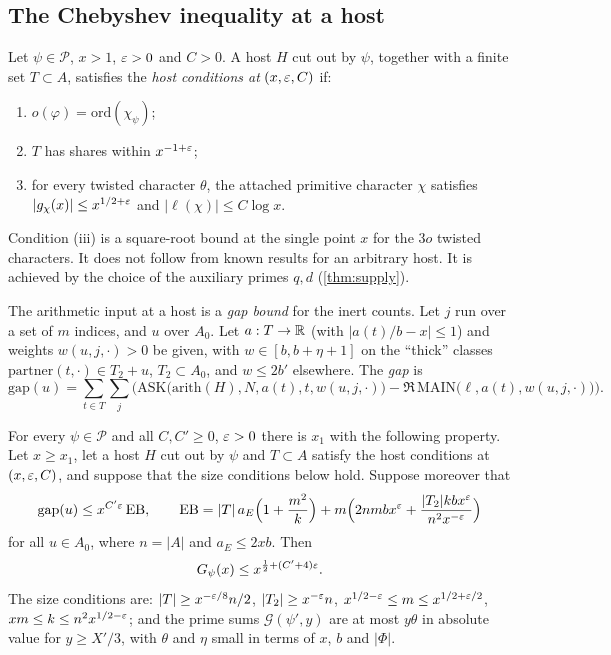 \subsection{The Chebyshev inequality at a host}

\begin{definition}\label{def:hosts:EAtH}
Let $\psi\in\mathcal P$, $x>1$, $\varepsilon>0$ and $C>0$. A host $H$ cut out by $\psi$, together with a finite
set $T\subset A$, satisfies the \emph{host conditions at} $(x,\varepsilon,C)$ if:
\begin{enumerate}[label=(\roman*)]
\item $o(\varphi)=\mathrm{ord}(\chi_\psi)$;
\item $T$ has shares within $x^{-1+\varepsilon}$;
\item for every twisted character $\theta$, the attached primitive character $\chi$ satisfies
$|g_\chi(x)|\le x^{1/2+\varepsilon}$ and $|\ell(\chi)|\le C\log x$.
\end{enumerate}
\end{definition}

Condition (iii) is a square-root bound at the single point $x$ for the $3o$ twisted characters. It does
not follow from known results for an arbitrary host. It is achieved by the choice of the auxiliary
primes $q,d$ (\cref{thm:supply}).

The arithmetic input at a host is a \emph{gap bound} for the inert counts. Let $j$ run over a set of
$m$ indices, and $u$ over $A_0$. Let $a:T\to\mathbb{R}$ (with $|a(t)/b-x|\le1$) and weights
$w(u,j,\cdot)>0$ be given, with $w\in[b,b+\eta+1]$ on the ``thick'' classes
$\mathrm{partner}(t,\cdot)\in T_2+u$, $T_2\subset A_0$, and $w\le2b'$ elsewhere. The \emph{gap} is
\[
\mathrm{gap}(u)=\sum_{t\in T}\sum_{j}\Big(\mathrm{ASK}\big(\mathrm{arith}(H),N,a(t),t,w(u,j,\cdot)\big)
-\Re\,\mathrm{MAIN}\big(\ell,a(t),w(u,j,\cdot)\big)\Big).
\]

\begin{theorem}\label{thm:cheb-windows}
For every $\psi\in\mathcal P$ and all $C,C'\ge0$, $\varepsilon>0$ there is $x_1$ with the following property.
Let $x\ge x_1$, let a host $H$ cut out by $\psi$ and $T\subset A$ satisfy the host conditions at
$(x,\varepsilon,C)$, and suppose that the size conditions below hold. Suppose moreover that
\[
\mathrm{gap}(u)\le x^{C'\varepsilon}\,\mathrm{EB},\qquad
\mathrm{EB}=|T|\,a_E\Big(1+\frac{m^2}k\Big)+m\Big(2nmbx^\varepsilon+\frac{|T_2|kbx^\varepsilon}{n^2x^{-\varepsilon}}\Big)
\]
for all $u\in A_0$, where $n=|A|$ and $a_E\le2xb$. Then
\[
G_\psi(x)\le x^{\frac12+(C'+4)\varepsilon}.
\]
The size conditions are: $|T|\ge x^{-\varepsilon/8}n/2$, $|T_2|\ge x^{-\varepsilon}n$, $x^{1/2-\varepsilon}\le m\le
x^{1/2+\varepsilon/2}$, $xm\le k\le n^2x^{1/2-\varepsilon}$; and the prime sums $\mathcal G(\psi',y)$ are at most
$y\theta$ in absolute value for $y\ge X'/3$, with $\theta$ and $\eta$ small in terms of $x$, $b$ and
$|\Phi|$.  
\end{theorem}

